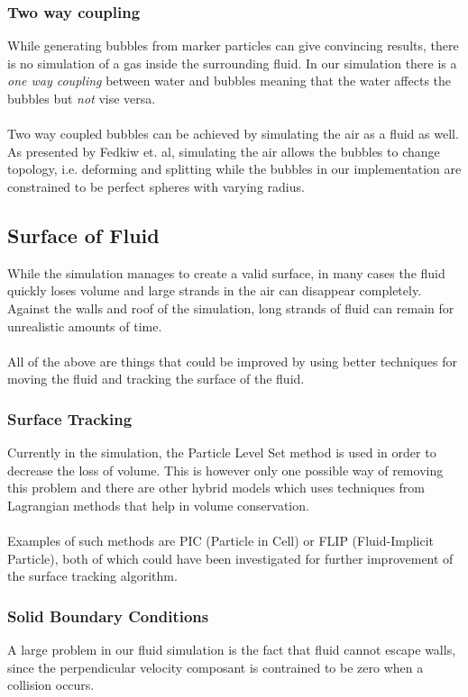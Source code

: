 \documentclass[twocolumn]{article}
\begin{document}
\subsubsection{Two way coupling}
While generating bubbles from marker particles can give convincing results, there is no simulation of a gas inside the surrounding fluid. In our simulation there is a \emph{one way coupling} between water and bubbles meaning that the water affects the bubbles but \emph{not} vise versa.
\\\\
Two way coupled bubbles can be achieved by simulating the air as a fluid as well. As presented by Fedkiw et. al\cite{two-way-bubbles}, simulating the air allows the bubbles to change topology, i.e. deforming and splitting while the bubbles in our implementation are constrained to be perfect spheres with varying radius.

\subsection{Surface of Fluid}
While the simulation manages to create a valid surface, in many cases the fluid quickly loses volume and large strands in the air can disappear completely. Against the walls and roof of the simulation, long strands of fluid can remain for unrealistic amounts of time.
\\\\
All of the above are things that could be improved by using better techniques for moving the fluid and tracking the surface of the fluid.

\subsubsection{Surface Tracking}
Currently in the simulation, the Particle Level Set method is used in order to decrease the loss of volume. This is however only one possible way of removing this problem and there are other hybrid models which uses techniques from Lagrangian methods that help in volume conservation.
\\\\
Examples of such methods are PIC (Particle in Cell) or FLIP (Fluid-Implicit Particle), both of which could have been investigated for further improvement of the surface tracking algorithm.

\subsubsection{Solid Boundary Conditions}
A large problem in our fluid simulation is the fact that fluid cannot escape walls, since the perpendicular velocity composant is contrained to be zero when a collision occurs.
\end{document}
